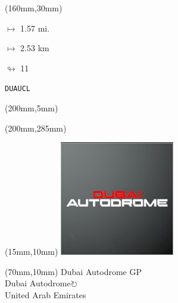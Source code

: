 \begin{textblock*}{40mm}(160mm,30mm)%
\Large
\par$\mapsto$ 1.57 mi.
\par$\mapsto$ 2.53 km
\par$\looparrowright$ 11
\par\hfill\tiny\tt DUAUCL\\
\end{textblock*}
\begin{textblock*}{20mm}(200mm,5mm)%
\fbox{\thepage}
\label{DUAUCL}
\end{textblock*}
\begin{textblock*}{20mm}(200mm,285mm)%
\fbox{\thepage}
\end{textblock*}

\null\newpage
\begin{textblock*}{50mm}(15mm,10mm)%
\includegraphics[width=50mm]{LG/2015-05-20_00081.png}
\end{textblock*}
\begin{textblock*}{130mm}(70mm,10mm)%
{\fontsize{20}{20}\selectfont Dubai Autodrome GP\\}
{\fontsize{16}{16}\selectfont Dubai Autodrome\hfill \Large$\circlearrowright$\\}
{\fontsize{12}{12}\selectfont United Arab Emirates\\}
\end{textblock*}
